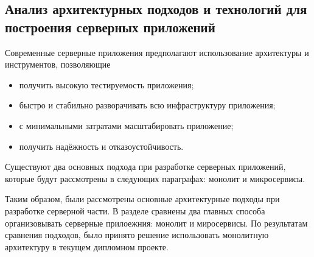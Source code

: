 \subsection{Анализ архитектурных подходов и технологий для построения серверных приложений}
\label{sec:analysis:research:backArch}

Современные серверные приложения предполагают использование архитектуры и инструментов, позволяющие

\begin{itemize}
\item получить высокую тестируемость приложения;
\item быстро и стабильно разворачивать всю инфраструктуру приложения;
\item с минимальными затратами масштабировать приложение;
\item получить надёжность и отказоустойчивость.
\end{itemize}

Существуют два основных подхода при разработке серверных приложений, которые будут рассмотрены в следующих параграфах: монолит и микросервисы.




Таким образом, были рассмотрены основные архитектурные подходы при разработке серверной части. В разделе сравнены два главных способа организовывать серверные прилоежния: монолит и миросервисы. По результатам сравнения подходов, было принято решение использовать монолитную архитектуру в текущем дипломном проекте.